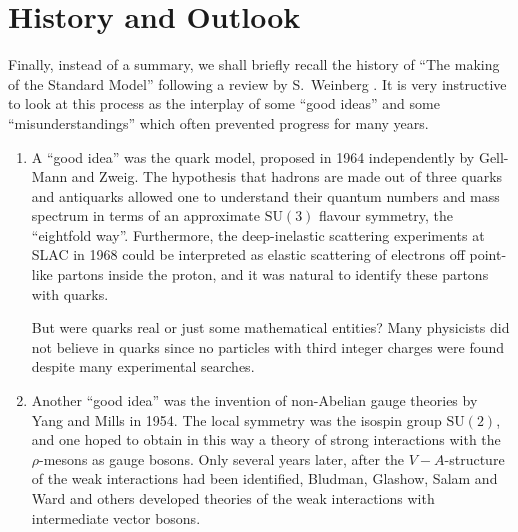 \documentclass[12pt]{report}
\newcommand{\2}{\ensuremath{\sqrt{2}\,}}
\begin{document}
{%
      

    \chapter{History and Outlook}
      Finally, instead of a summary, we shall briefly recall the history of ``The making of the
      Standard Model'' following a review by S.~Weinberg \cite{Weinberg:2004kv}. It is very
      instructive to look at this process as the interplay of some ``good ideas'' and some
      ``misunderstandings'' which often prevented progress for many years.   

      \begin{enumerate}
        \item A ``good idea'' was the quark model, proposed in 1964 independently by Gell-Mann and
          Zweig. The hypothesis that hadrons are made out of three quarks and antiquarks allowed one
          to understand their quantum numbers and mass spectrum in terms of an approximate
          $\mathrm{SU(3)}$ flavour symmetry, the ``eightfold way''. Furthermore, the deep-inelastic
          scattering experiments at SLAC in 1968 could be interpreted as elastic scattering of
          electrons off point-like partons inside the proton, and it was natural to identify these
          partons with quarks.    

          But were quarks real or just some mathematical entities? Many physicists did not believe
          in quarks since no particles with third integer charges were found despite many
          experimental searches.

        
         \item Another ``good idea'' was the invention of non-Abelian gauge theories by Yang and Mills
           in 1954. The local symmetry was the isospin group $\mathrm{SU(2)}$, and one hoped to
           obtain in this way a theory of strong interactions with the $\rho$-mesons as gauge
           bosons. Only several years later, after the $V-A$-structure of the weak interactions
           had been identified, Bludman, Glashow, Salam and Ward and others developed theories of 
           the weak 
           interactions with intermediate vector bosons.


\end{enumerate}}
\end{document}
